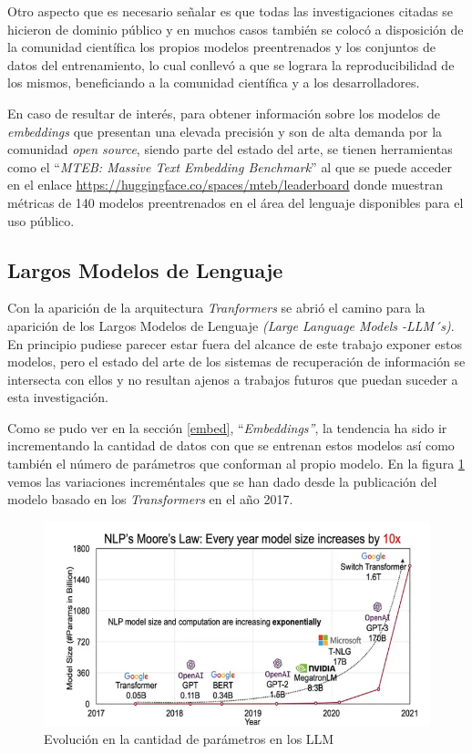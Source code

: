 \documentclass[
  12pt,
  openany]{book}
\begin{document}
Otro aspecto que es necesario señalar es que todas las investigaciones citadas se hicieron de dominio público y en muchos casos también se colocó a disposición de la comunidad científica los propios modelos preentrenados y los conjuntos de datos del entrenamiento, lo cual conllevó a que se lograra la reproducibilidad de los mismos, beneficiando a la comunidad científica y a los desarrolladores.

En caso de resultar de interés, para obtener información sobre los modelos de \emph{embeddings} que presentan una elevada precisión y son de alta demanda por la comunidad \emph{open source}, siendo parte del estado del arte, se tienen herramientas como el ``\emph{MTEB: Massive Text Embedding Benchmark}'' \citep{muennighoff2022} al que se puede acceder en el enlace \url{https://huggingface.co/spaces/mteb/leaderboard} donde muestran métricas de 140 modelos preentrenados en el área del lenguaje disponibles para el uso público.

\hypertarget{LLM}{%
\subsection{Largos Modelos de Lenguaje}\label{LLM}}

Con la aparición de la arquitectura \emph{Tranformers} se abrió el camino para la aparición de los Largos Modelos de Lenguaje \emph{(Large Language Models -LLM´s)}. En principio pudiese parecer estar fuera del alcance de este trabajo exponer estos modelos, pero el estado del arte de los sistemas de recuperación de información se intersecta con ellos y no resultan ajenos a trabajos futuros que puedan suceder a esta investigación.

Como se pudo ver en la sección \ref{embed}, ``\emph{Embeddings''}, la tendencia ha sido ir incrementando la cantidad de datos con que se entrenan estos modelos así como también el número de parámetros que conforman al propio modelo. En la figura \ref{fig:llm} vemos las variaciones increméntales que se han dado desde la publicación del modelo basado en los \emph{Transformers} en el año 2017.

\begin{figure}

{\centering \includegraphics[width=0.85\linewidth]{images/03-marco-teorico/llms} 

}

\caption{Evolución en la cantidad de parámetros en los LLM}\label{fig:llm}
\end{figure}
\end{document}
